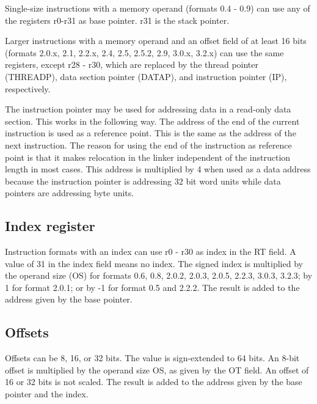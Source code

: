 \documentclass[forwardcom.tex]{subfiles}
\begin{document}
Single-size instructions with a memory operand (formats 0.4 - 0.9) can use any of the registers r0-r31 as base pointer. r31 is the stack pointer.
\vv

Larger instructions with a memory operand and an offset field of at least 16 bits (formats 2.0.x, 2.1, 2.2.x, 2.4, 2.5, 2.5.2, 2.9, 3.0.x, 3.2.x) can use the same registers, except r28 - r30,  which are replaced by the thread pointer (THREADP), data section pointer (DATAP), and instruction pointer (IP), respectively.
\vv

The instruction pointer may be used for addressing data in a read-only data section. This works in the following way. The address of the end of the current instruction is used as a reference point. This is the same as the address of the next instruction. The reason for using the end of the instruction as reference point is that it makes relocation in the linker independent of the instruction length in most cases. This address is multiplied by 4 when used as a data address because the instruction pointer is addressing 32 bit word units while data pointers are addressing byte units.
\vv


\subsection{Index register}
Instruction formats with an index can use r0 - r30 as index in the RT field. 
A value of 31 in the index field means no index. The signed index is multiplied by the operand size (OS) for formats 0.6, 0.8, 2.0.2, 2.0.3, 2.0.5, 2.2.3, 3.0.3, 3.2.3; by 1 for format 2.0.1; or by -1 for format 0.5 and 2.2.2. The result is added to the address given by the base pointer.
\vv

\subsection{Offsets}
Offsets can be 8, 16, or 32 bits. The value is sign-extended to 64 bits. An 8-bit offset is multiplied by the operand size OS, as given by the OT field. An offset of 16 or 32 bits is not scaled. The result is added to the address given by the base pointer and the index.
\vv

\end{document}
